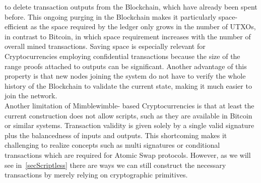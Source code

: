 to delete transaction outputs from the Blockchain, which have already been spent before. This ongoing purging in the Blockchain makes it particularly space-efficient as the
space required by the ledger only grows in the number of UTXOs, in contrast to Bitcoin, in which space requirement increases with the number of overall mined transactions.
Saving space is especially relevant for Cryptocurrencies employing confidential transactions because the size of the range proofs attached to outputs can be significant.
Another advantage of this property is that new nodes joining the system do not have to verify the whole history of the Blockchain to validate the current state, making it much easier to join the network. \\
Another limitation of Mimblewimble- based Cryptocurrencies is that at least the current construction does not allow scripts, such as they are available in Bitcoin or similar systems.
Transaction validity is given solely by a single valid signature plus the balancedness of inputs and outputs.
This shortcoming makes it challenging to realize concepts such as multi signatures or conditional transactions which are required for Atomic Swap protocols. However,
as we will see in~\ref{secScriptless} there are ways we can still construct the necessary transactions by merely relying on cryptographic primitives.


